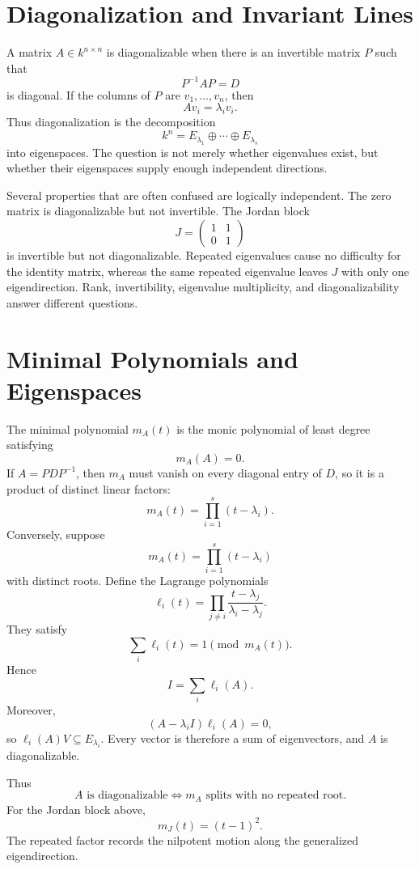
\section{Diagonalization and Invariant Lines}

A matrix \(A\in k^{n\times n}\) is diagonalizable when there is an invertible matrix \(P\) such that
\[
  P^{-1}AP=D
\]
is diagonal.  If the columns of \(P\) are \(v_1,\ldots,v_n\), then
\[
  Av_i=\lambda_i v_i.
\]
Thus diagonalization is the decomposition
\[
  k^n=E_{\lambda_1}\oplus\cdots\oplus E_{\lambda_s}
\]
into eigenspaces.  The question is not merely whether eigenvalues exist, but whether their eigenspaces supply enough independent directions.

Several properties that are often confused are logically independent.  The zero matrix is diagonalizable but not invertible.  The Jordan block
\[
  J=
  \begin{pmatrix}
    1&1\\
    0&1
  \end{pmatrix}
\]
is invertible but not diagonalizable.  Repeated eigenvalues cause no difficulty for the identity matrix, whereas the same repeated eigenvalue leaves \(J\) with only one eigendirection.  Rank, invertibility, eigenvalue multiplicity, and diagonalizability answer different questions.

\section{Minimal Polynomials and Eigenspaces}

The minimal polynomial \(m_A(t)\) is the monic polynomial of least degree satisfying
\[
  m_A(A)=0.
\]
If \(A=PDP^{-1}\), then \(m_A\) must vanish on every diagonal entry of \(D\), so it is a product of distinct linear factors:
\[
  m_A(t)=\prod_{i=1}^s(t-\lambda_i).
\]
Conversely, suppose
\[
  m_A(t)=\prod_{i=1}^s(t-\lambda_i)
\]
with distinct roots.  Define the Lagrange polynomials
\[
  \ell_i(t)
  =\prod_{j\ne i}
  \frac{t-\lambda_j}{\lambda_i-\lambda_j}.
\]
They satisfy
\[
  \sum_i\ell_i(t)=1
  \pmod{m_A(t)}.
\]
Hence
\[
  I=\sum_i\ell_i(A).
\]
Moreover,
\[
  (A-\lambda_iI)\ell_i(A)=0,
\]
so \(\ell_i(A)V\subseteq E_{\lambda_i}\).  Every vector is therefore a sum of eigenvectors, and \(A\) is diagonalizable.

Thus
\[
  \boxed{
  A\text{ is diagonalizable}
  \iff
  m_A\text{ splits with no repeated root}.}
\]
For the Jordan block above,
\[
  m_J(t)=(t-1)^2.
\]
The repeated factor records the nilpotent motion along the generalized eigendirection.

